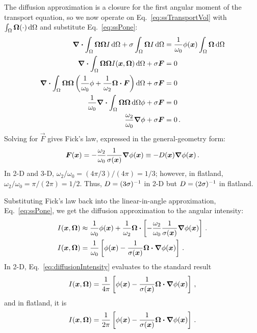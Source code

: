 The diffusion approximation is a closure for the first angular moment of
the transport equation, so we now operate on Eq.~\eqref{eq:ssTransportVol} with
$\int_\Omega \bm{\Omega} (\cdot) \mathop{}\!\mathrm{d} \Omega$ and substitute
Eq.~\eqref{eq:ssPone}:
\begin{align*}
  \bm{\nabla} \bm{\cdot} \int_\Omega \bm{\Omega} \bm{\Omega} I
  \mathop{}\!\mathrm{d}\Omega
  + \sigma \int_\Omega \bm{\Omega} I \mathop{}\!\mathrm{d}\Omega
  &= \frac{1}{\omega_0} \phi(\bm{x}) \int_\Omega \bm{\Omega} \mathop{}\!\mathrm{d}\Omega
  \\
  \bm{\nabla} \bm{\cdot} \int_\Omega \bm{\Omega} \bm{\Omega} I(\bm{x}, \bm{\Omega})
  \mathop{}\!\mathrm{d}\Omega
  + \sigma \bm{F}
  &= 0
  \\
  \bm{\nabla} \bm{\cdot} \int_\Omega \bm{\Omega} \bm{\Omega} \left(
  \frac{1}{\omega_0}\phi + \frac{1}{\omega_2} \bm{\Omega} \bm{\cdot} \bm{F}
  \right) \mathop{}\!\mathrm{d}\Omega
  + \sigma \bm{F}
  &= 0
  \\
  \frac{1}{\omega_0} \bm{\nabla} \bm{\cdot} \int_\Omega \bm{\Omega} \bm{\Omega}
  \mathop{}\!\mathrm{d}\Omega \phi 
  + \sigma \bm{F} &= 0
  \\
  \frac{\omega_2}{\omega_0} \bm{\nabla} \phi + \sigma \bm{F} &= 0 \,.
\end{align*}
Solving for $\vec{F}$ gives Fick's law, expressed in the general-geometry form:
\begin{equation} \label{eq:fickGeneral}
  \bm{F}(\bm{x})
  = - \frac{\omega_2}{\omega_0} \frac{1}{\sigma(\bm{x})} \bm{\nabla} \phi(\bm{x})
  \equiv -D(\bm{x}) \bm{\nabla} \phi(\bm{x})\,.
\end{equation}
In 2-D and 3-D, $\omega_2/\omega_0 = (4\pi / 3) / (4\pi) = 1/3$; however, in
flatland, $\omega_2/\omega_0 = \pi / (2\pi) = 1/2$. Thus, $D=(3\sigma)^{-1}$ in
2-D but $D=(2\sigma)^{-1}$ in flatland.

Substituting Fick's law back into the linear-in-angle approximation,
Eq.~\eqref{eq:ssPone}, we get the diffusion approximation to the angular
intensity:
\begin{align} \nonumber
  I(\bm{x}, \bm{\Omega})
  &\approx \frac{1}{\omega_0} \phi(\bm{x})
  + \frac{1}{\omega_2} \bm{\Omega} \bm{\cdot} \left[ - \frac{\omega_2}{\omega_0}
  \frac{1}{\sigma(\bm{x})} \bm{\nabla} \phi(\bm{x}) \right]\,.
  \\ \label{eq:diffusionIntensity}
  I(\bm{x}, \bm{\Omega})
  &= \frac{1}{\omega_0} \left[ \phi(\bm{x})
  - \frac{1}{\sigma(\bm{x})}
  \bm{\Omega} \bm{\cdot} \bm{\nabla} \phi(\bm{x}) \right] \,.
\end{align}
In 2-D, Eq.~\eqref{eq:diffusionIntensity} evaluates to the standard result
\begin{equation*}
 I(\bm{x}, \bm{\Omega})
= \frac{1}{4\pi} \left[ \phi(\bm{x}) - \frac{1}{\sigma(\bm{x})} \bm{\Omega}
\bm{\cdot} \bm{\nabla} \phi(\bm{x}) \right] \,,
\end{equation*}
and in flatland, it is
\begin{equation}\label{eq:flatlandDiffusion}
 I(\bm{x}, \bm{\Omega})
= \frac{1}{2\pi} \left[ \phi(\bm{x}) - \frac{1}{\sigma(\bm{x})} \bm{\Omega}
\bm{\cdot} \bm{\nabla} \phi(\bm{x}) \right]\,.
\end{equation}


